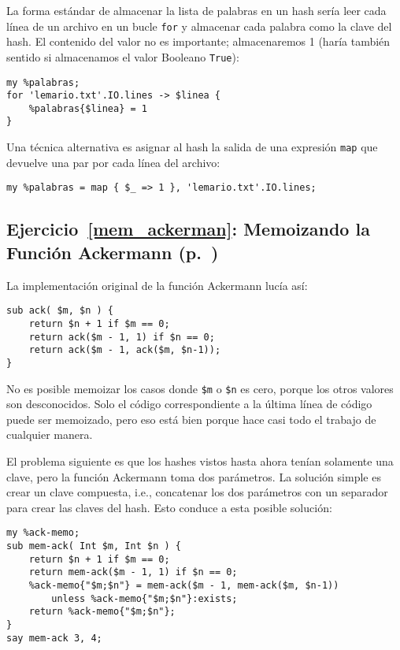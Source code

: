La forma estándar de almacenar la lista de palabras en un
hash sería leer cada línea de un archivo en un bucle {\tt for}
y almacenar cada palabra como la clave del hash. El contenido
del valor no es importante; almacenaremos 1 (haría también
sentido si almacenamos el valor Booleano \verb|True|):

\begin{verbatim}
my %palabras;
for 'lemario.txt'.IO.lines -> $linea {
    %palabras{$linea} = 1
}
\end{verbatim}

Una técnica alternativa es asignar al hash la salida de una 
expresión {\tt map} que devuelve una par por cada línea del
archivo:

\begin{verbatim}
my %palabras = map { $_ => 1 }, 'lemario.txt'.IO.lines;
\end{verbatim}
%

\subsection{Ejercicio~\ref{mem_ackerman}: Memoizando la Función Ackermann (p.~\pageref{mem_ackerman})}
\label{sol_mem_ackerman}

La implementación original de la función Ackermann
lucía así:

\begin{verbatim}
sub ack( $m, $n ) {
    return $n + 1 if $m == 0;
    return ack($m - 1, 1) if $n == 0;
    return ack($m - 1, ack($m, $n-1));
}
\end{verbatim}

No es posible memoizar los casos donde \verb|$m| o \verb|$n|
es cero, porque los otros valores son desconocidos. Solo
el código correspondiente a la última línea de código 
puede ser memoizado, pero eso está bien porque hace
casi todo el trabajo de cualquier manera.

El problema siguiente es que los hashes vistos hasta ahora 
tenían solamente una clave, pero la función Ackermann toma
dos parámetros. La solución simple es crear un clave compuesta,
i.e., concatenar los dos parámetros con un separador para crear
las claves del hash. Esto conduce a esta posible solución:

\begin{verbatim}
my %ack-memo;
sub mem-ack( Int $m, Int $n ) {
    return $n + 1 if $m == 0;
    return mem-ack($m - 1, 1) if $n == 0;
    %ack-memo{"$m;$n"} = mem-ack($m - 1, mem-ack($m, $n-1))
        unless %ack-memo{"$m;$n"}:exists;
    return %ack-memo{"$m;$n"};
}
say mem-ack 3, 4;
\end{verbatim} 

